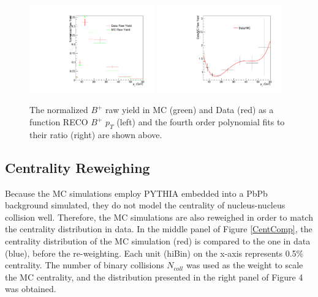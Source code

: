 \begin{figure}[h]
\begin{center}
\includegraphics[width= 0.48\textwidth]{Figures/Chapter4/BPBptDataMC1.pdf}
\includegraphics[width= 0.48\textwidth]{Figures/Chapter4/BPBptDataMC2.pdf}
\caption{The normalized $B^+$ raw yield in MC (green) and Data (red) as a function RECO $B^+$ $p_T$ (left) and the fourth order polynomial fits to their ratio (right) are shown above.}
\label{BPBptWeight}
\end{center}
\end{figure}


\subsection{Centrality Reweighing}

Because the MC simulations employ PYTHIA embedded into a PbPb background simulated, they do not model the centrality of nucleus-nucleus collision well. Therefore, the MC simulations are also reweighed in order to match the centrality distribution in data. In the middle panel of Figure \ref{CentComp}, the centrality distribution of the MC simulation (red) is compared to the one in data (blue), before the re-weighting. Each unit (hiBin) on the x-axis represents 0.5\% centrality. The number of binary collisions $N_{coll}$ was used as the weight to scale the MC centrality, and the distribution presented in the right panel of Figure 4 was obtained. 

